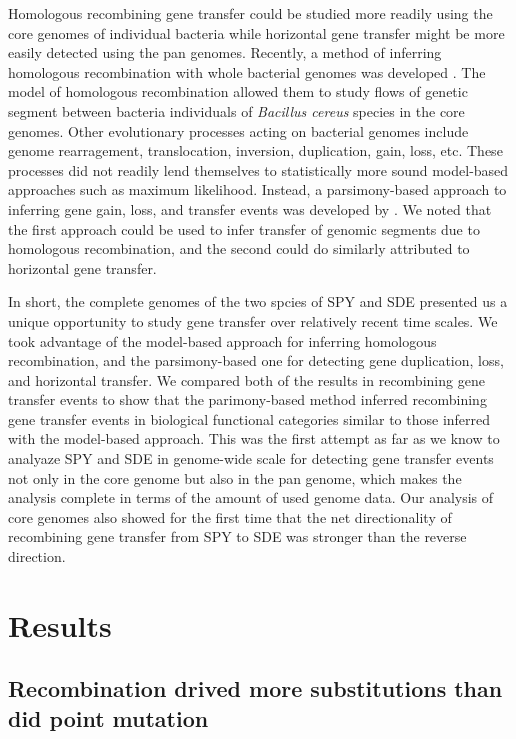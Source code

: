 \documentclass[english]{article}
\begin{document}
Homologous recombining gene transfer could be studied more readily using the
core genomes of individual bacteria while horizontal gene transfer might be more
easily detected using the pan genomes. Recently, a method of inferring
homologous recombination with whole bacterial genomes was developed
\citep{Didelot2010}. The model of homologous recombination allowed them to study
flows of genetic segment between bacteria individuals of \textit{Bacillus
cereus} species in the core genomes.  Other evolutionary processes acting on
bacterial genomes include genome rearragement, translocation, inversion,
duplication, gain, loss, etc.  These processes did not readily lend themselves
to statistically more sound model-based approaches such as maximum likelihood.
Instead, a parsimony-based approach to inferring gene gain, loss, and transfer
events was developed by \citep{Doyon2011}.  We noted that the first approach
could be used to infer transfer of genomic segments due to homologous
recombination, and the second could do similarly attributed to horizontal gene
transfer. 

In short, the complete genomes of the two spcies of SPY and SDE presented us a
unique opportunity to study gene transfer over relatively recent time scales.
We took advantage of the model-based approach for inferring homologous
recombination, and the parsimony-based one for detecting gene duplication, loss,
and horizontal transfer. We compared both of the results in recombining gene
transfer events to show that the parimony-based method inferred recombining gene
transfer events in biological functional categories similar to those inferred
with the model-based approach. This was the first attempt as far as we know to
analyaze SPY and SDE in genome-wide scale for detecting gene transfer events not
only in the core genome but also in the pan genome, which makes the analysis
complete in terms of the amount of used genome data. Our analysis of core
genomes also showed for the first time that the net directionality of
recombining gene transfer from SPY to SDE was stronger than the reverse
direction.

\clearpage{}

\section{Results}

\subsection{Recombination drived more substitutions than did point mutation}
\end{document}
